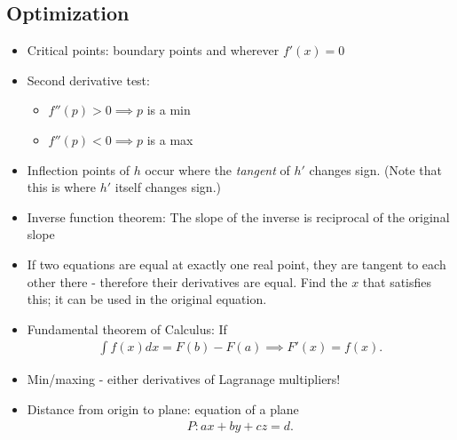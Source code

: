 \hypertarget{optimization}{%
\subsection{Optimization}\label{optimization}}

\begin{itemize}
\item
  Critical points: boundary points and wherever \(f'(x) = 0\)
\item
  Second derivative test:

  \begin{itemize}
  \tightlist
  \item
    \(f''(p) > 0 \implies p\) is a min
  \item
    \(f''(p) < 0 \implies p\) is a max
  \end{itemize}
\item
  Inflection points of \(h\) occur where the \emph{tangent} of \(h'\)
  changes sign. (Note that this is where \(h'\) itself changes sign.)
\item
  Inverse function theorem: The slope of the inverse is reciprocal of
  the original slope
\item
  If two equations are equal at exactly one real point, they are tangent
  to each other there - therefore their derivatives are equal. Find the
  \(x\) that satisfies this; it can be used in the original equation.
\item
  Fundamental theorem of Calculus: If
  \begin{align*}  
  \int f(x) dx = F(b) - F(a) \implies F'(x) = f(x)
  .\end{align*}
\item
  Min/maxing - either derivatives of Lagranage multipliers!
\item
  Distance from origin to plane: equation of a plane
  \begin{align*}  
  P: ax+by+cz=d
  .\end{align*}


\end{itemize}
